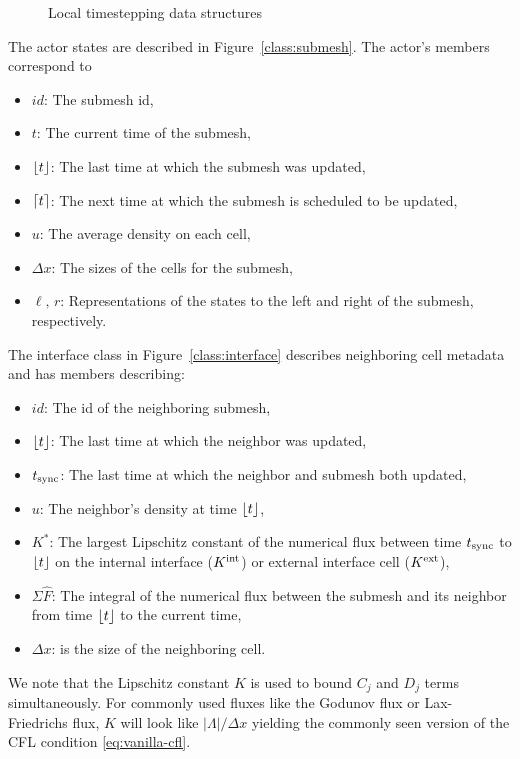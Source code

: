 \begin{figure}
\centering
{}\hspace{2in}
\caption{Local timestepping data structures}
\end{figure}

The actor states are described in Figure~\ref{class:submesh}. The actor's members correspond to
\begin{itemize}
\item $id$: The submesh id,
\item $t$: The current time of the submesh,
\item $\lfloor t \rfloor$: The last time at which the submesh was updated,
\item $\lceil t \rceil$: The next time at which the submesh is scheduled to be updated,
\item $u$: The average density on each cell,
\item $\Delta x$: The sizes of the cells for the submesh,
\item $\ell,\,r$: Representations of the states to the left and right of the submesh, respectively. 
\end{itemize}
The interface class in Figure~\ref{class:interface} describes neighboring cell metadata and has members describing: %
\begin{itemize}
\item $id$: The id of the neighboring submesh,
\item $\lfloor t \rfloor$: The last time at which the neighbor was updated,
\item $t_{\text{sync}}$: The last time at which the neighbor and submesh both updated,
\item $u$: The neighbor's density at time $\lfloor t \rfloor$,
\item $K^*$: The largest Lipschitz constant of the numerical flux between time $t_{\text{sync}}$ to $\lfloor t \rfloor$ on the internal interface ($K^{\text{int}}$) or external interface cell ($K^{\text{ext}}$),
\item $\Sigma \hat{F}$: The integral of the numerical flux between the submesh and its neighbor from time $\lfloor t \rfloor$ to the current time,
\item $\Delta x$: is the size of the neighboring cell.
\end{itemize}
We note that the Lipschitz constant $K$ is used to bound $C_j$ and $D_j$ terms simultaneously. For commonly used fluxes like the Godunov flux or Lax-Friedrichs flux, $K$ will look like $|\Lambda|/\Delta x$ yielding the commonly seen version of the CFL condition \eqref{eq:vanilla-cfl}.
